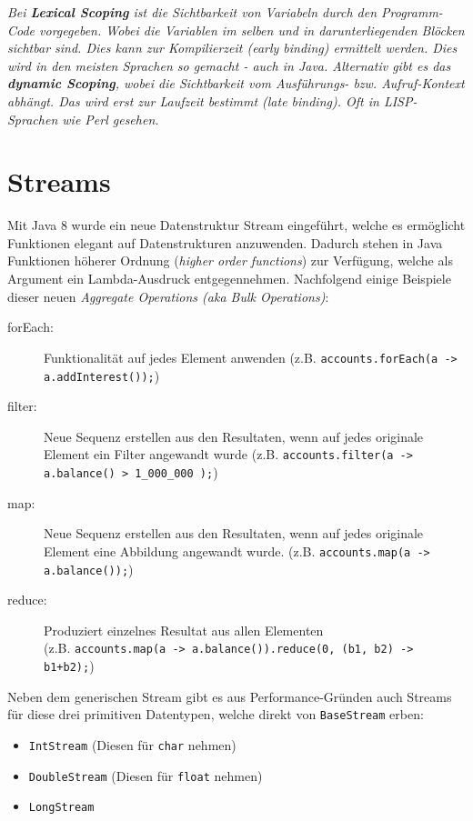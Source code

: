\textit{Bei \textbf{Lexical Scoping} ist die Sichtbarkeit von Variabeln durch den Programm-Code vorgegeben. Wobei die Variablen im selben und in darunterliegenden Blöcken sichtbar sind. Dies kann zur Kompilierzeit (early binding) ermittelt werden. Dies wird in den meisten Sprachen so gemacht - auch in Java. Alternativ gibt es das \textbf{dynamic Scoping}, wobei die Sichtbarkeit vom Ausführungs- bzw. Aufruf-Kontext abhängt. Das wird erst zur Laufzeit bestimmt (late binding). Oft in LISP-Sprachen wie Perl gesehen.}

\section{Streams}

Mit Java 8 wurde ein neue Datenstruktur Stream eingeführt, welche es ermöglicht Funktionen elegant auf Datenstrukturen anzuwenden. Dadurch stehen in Java Funktionen höherer Ordnung (\textit{higher order functions}) zur Verfügung, welche als Argument ein Lambda-Ausdruck entgegennehmen. Nachfolgend einige Beispiele dieser neuen \textit{Aggregate Operations (aka Bulk Operations)}:
\begin{description}
	\item[forEach:] Funktionalität auf jedes Element anwenden (z.B. \verb|accounts.forEach(a -> a.addInterest());|)
	\item[filter:] Neue Sequenz erstellen aus den Resultaten, wenn auf jedes originale Element ein Filter angewandt wurde (z.B. \verb|accounts.filter(a -> a.balance() > 1_000_000 );|)
	\item[map:] Neue Sequenz erstellen aus den Resultaten, wenn auf jedes originale Element eine Abbildung angewandt wurde. (z.B. \verb|accounts.map(a -> a.balance());|)
	\item[reduce:] Produziert einzelnes Resultat aus allen Elementen \\ 
	(z.B. \verb|accounts.map(a -> a.balance()).reduce(0, (b1, b2) -> b1+b2);|)
\end{description}
Neben dem generischen Stream gibt es aus Performance-Gründen auch Streams für diese drei primitiven Datentypen, welche direkt von \verb|BaseStream| erben:
\begin{itemize}
	\item \verb|IntStream| (Diesen für \verb|char| nehmen)
	\item \verb|DoubleStream| (Diesen für \verb|float| nehmen)
	\item \verb|LongStream|
\end{itemize}
